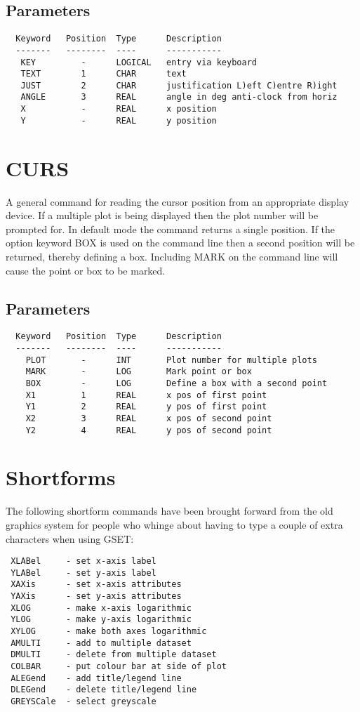 \documentclass{book}
\renewcommand{\_}{{\tt\char'137}}     %
\begin{document}
\subsection{Parameters}
\begin{verbatim}
  Keyword   Position  Type      Description
  -------   --------  ----      -----------
   KEY         -      LOGICAL   entry via keyboard
   TEXT        1      CHAR      text
   JUST        2      CHAR      justification L)eft C)entre R)ight
   ANGLE       3      REAL      angle in deg anti-clock from horiz
   X           -      REAL      x position
   Y           -      REAL      y position

\end{verbatim}\section{CURS}
A general command for reading the cursor position from an appropriate
display device. If a multiple plot is being displayed then the plot
number will be prompted for. In default mode the command returns a
single position. If the option keyword BOX is used on the command
line then a second position will be returned, thereby defining a box.
Including MARK on the command line will cause the point or box to be
marked.

\subsection{Parameters}
\begin{verbatim}
  Keyword   Position  Type      Description
  -------   --------  ----      -----------
    PLOT       -      INT       Plot number for multiple plots
    MARK       -      LOG       Mark point or box
    BOX        -      LOG       Define a box with a second point
    X1         1      REAL      x pos of first point
    Y1         2      REAL      y pos of first point
    X2         3      REAL      x pos of second point
    Y2         4      REAL      y pos of second point

\end{verbatim}\section{Shortforms}
The following shortform commands have been brought forward from the
old graphics system for people who whinge about having to type a
couple of extra characters when using GSET:
\begin{verbatim}
 XLABel     - set x-axis label
 YLABel     - set y-axis label
 XAXis      - set x-axis attributes
 YAXis      - set y-axis attributes
 XLOG       - make x-axis logarithmic
 YLOG       - make y-axis logarithmic
 XYLOG      - make both axes logarithmic
 AMULTI     - add to multiple dataset
 DMULTI     - delete from multiple dataset
 COLBAR     - put colour bar at side of plot
 ALEGend    - add title/legend line
 DLEGend    - delete title/legend line
 GREYSCale  - select greyscale
\end{verbatim}
\end{document}
